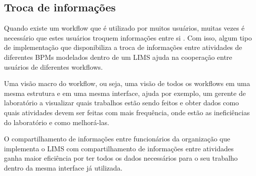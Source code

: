 \subsection{Troca de informações}


Quando existe um workflow que é utilizado por muitos usuários, muitas vezes é necessário que estes usuários troquem informações entre si \R. Com isso, algum tipo de implementação que disponibiliza a troca de informações entre atividades de diferentes BPMs modelados dentro de um LIMS ajuda na cooperação entre usuários de diferentes workflows.






Uma visão macro do workflow, ou seja, uma visão de todos os workflows em uma mesma estrutura e em uma mesma interface, ajuda por exemplo, um gerente de laboratório a visualizar quais trabalhos estão sendo feitos e obter dados como quais atividades devem ser feitas com mais frequência, onde estão as ineficiências do laboratório e como melhorá-las.

O compartilhamento de informações entre funcionários da organização que implementa o LIMS com compartilhamento de informações entre atividades ganha maior eficiência por ter todos os dados necessários para o seu trabalho dentro da mesma interface já utilizada.

